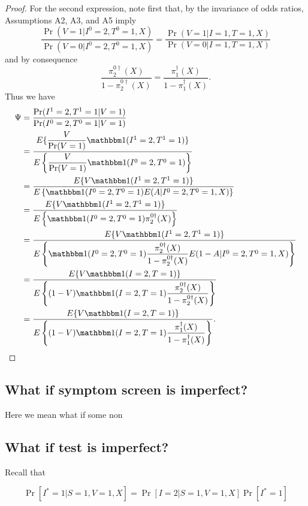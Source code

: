 \begin{appendix}
\begin{proof}
    For the second expression, note first that, by the invariance of odds ratios, Assumptions A2, A3, and A5 imply
    \begin{equation*}
        \dfrac{\Pr(V = 1 | I^0 = 2, T^0 = 1, X)}{\Pr(V = 0 | I^0 = 2,  T^0 = 1, X)} = \dfrac{\Pr(V = 1 | I = 1, T = 1, X)}{\Pr(V = 0 | I = 1,  T = 1, X)}
    \end{equation*}
    and by consequence 
    \begin{equation*}
        \dfrac{\pi^{0\dagger}_2(X)}{1 - \pi^{0\dagger}_2(X)} = \dfrac{\pi^\dagger_1(X)}{1 - \pi^\dagger_1(X)}.
    \end{equation*}
    Thus we have
    \begin{align*}
        \Psi &= \dfrac{\Pr(I^1=2, T^1 = 1|V=1)}{\Pr(I^0=2, T^0 = 1|V=1)} \\
        &= \dfrac{E\{\dfrac{V}{\Pr(V=1)} \mathbbm 1 (I^1 = 2, T^1 = 1)\}}{E\left\{\dfrac{V}{\Pr(V=1)}\mathbbm 1 (I^0 = 2, T^0 = 1)\right\}} \\
        &= \dfrac{E\{V \mathbbm 1 (I^1 = 2, T^1 = 1)\}}{E\left\{\mathbbm 1 (I^0 = 2, T^0 = 1) E(A | I^0 = 2, T^0 = 1, X)\right\}} \\
        &= \dfrac{E\{V \mathbbm 1 (I^1 = 2, T^1 = 1)\}}{E\left\{\mathbbm 1 (I^0 = 2, T^0 = 1) \pi^{0\dagger}_2(X)\right\}} \\
        &= \dfrac{E\{V \mathbbm 1 (I^1 = 2, T^1 = 1)\}}{E\left\{\mathbbm 1 (I^0 = 2, T^0 = 1) \dfrac{\pi^{0\dagger}_2(X)}{1-\pi^{0\dagger}_2(X)}E(1-A|I^0 = 2, T^0 = 1, X)\right\}} \\
        &= \dfrac{E\{V \mathbbm 1 (I = 2, T = 1)\}}{E\left\{(1 - V)\mathbbm 1 (I = 2, T = 1) \dfrac{\pi^{0\dagger}_2(X)}{1-\pi^{0\dagger}_2(X)}\right\}} \\
        &= \dfrac{E\{V \mathbbm 1 (I = 2, T = 1)\}}{E\left\{(1 - V)\mathbbm 1 (I = 2, T = 1) \dfrac{\pi^\dagger_1(X)}{1-\pi^\dagger_1(X)}\right\}}.
    \end{align*}
    \end{proof}

\newpage
\subsection{What if symptom screen is imperfect?}
Here we mean what if some non
\newpage
\subsection{What if test is imperfect?}
Recall that 

$$\Pr[I^* = 1 | S = 1, V = 1, X] = \Pr[I = 2 | S = 1, V = 1, X] \Pr[I^* = 1]$$


\end{appendix}
